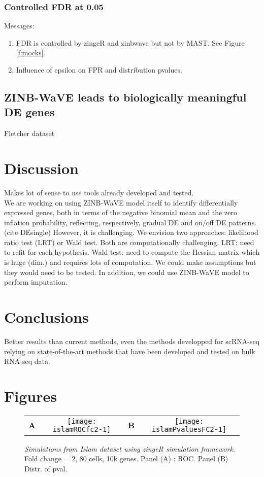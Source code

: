 \documentclass{article}
\begin{document}
\subsubsection*{Controlled FDR at 0.05}
Messages:
\begin{enumerate}
\item FDR is controlled by zingeR and zinbwave but not by MAST. See Figure \ref{f:mocks}.
\item Influence of epsilon on FPR and distribution pvalues.
\end{enumerate}

\subsection*{ZINB-WaVE leads to biologically meaningful DE genes}
Fletcher dataset

\section*{Discussion}
Makes lot of sense to use tools already developed and tested.\\

We are working on using ZINB-WaVE model itself to identify differentially expressed genes, both in terms of the negative binomial mean and the zero inflation probability, reflecting, respectively, gradual DE and on/off DE patterns. (cite DEsingle) However, it is challenging. We envision two approaches: likelihood ratio test (LRT) or Wald test. Both are computationally challenging. LRT: need to refit for each hypothesis. Wald test: need to compute the Hessian matrix which is huge (dim.) and requires lots of computation. We could make assumptions but they would need to be tested. In addition, we could use ZINB-WaVE model to perform imputation.\\

\section*{Conclusions}
Better results than current methods, even the methods developped for scRNA-seq relying on state-of-the-art methods that have been developed and tested on bulk RNA-seq data.

\section*{Figures}

\begin{figure}[ht]
\begin{center}
\begin{tabular}{cccc}
\textbf{A} &
\texttt{[image: islamROCfc2-1]} &
\textbf{B} &
\texttt{[image: islamPvaluesFC2-1]} 
\end{tabular}
\end{center}
\caption{{\em Simulations from Islam dataset using zingeR simulation framework.} Fold change = 2, 80 cells, 10k genes. Panel (A) : ROC. Panel (B) Distr. of pval.}
\label{f:islamFC2}
\end{figure}
\end{document}
